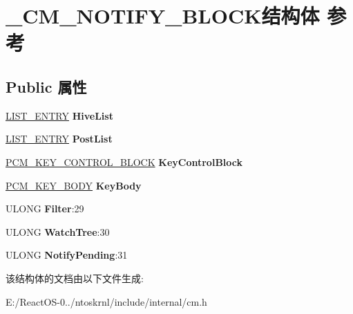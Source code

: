 \hypertarget{struct___c_m___n_o_t_i_f_y___b_l_o_c_k}{}\section{\+\_\+\+C\+M\+\_\+\+N\+O\+T\+I\+F\+Y\+\_\+\+B\+L\+O\+C\+K结构体 参考}
\label{struct___c_m___n_o_t_i_f_y___b_l_o_c_k}
\subsection*{Public 属性}
\begin{DoxyCompactItemize}
\item 
\mbox{\label{struct___c_m___n_o_t_i_f_y___b_l_o_c_k_a18d08b58c4d7385ede893b7e9ea954f4}} 
\hyperlink{struct___l_i_s_t___e_n_t_r_y}{L\+I\+S\+T\+\_\+\+E\+N\+T\+RY} {\bfseries Hive\+List}
\item 
\mbox{\label{struct___c_m___n_o_t_i_f_y___b_l_o_c_k_ad6dd92e2f87c396643b922464909ae00}} 
\hyperlink{struct___l_i_s_t___e_n_t_r_y}{L\+I\+S\+T\+\_\+\+E\+N\+T\+RY} {\bfseries Post\+List}
\item 
\mbox{\label{struct___c_m___n_o_t_i_f_y___b_l_o_c_k_a5061ac742d67a7c5cb9815509926cf3f}} 
\hyperlink{struct___c_m___k_e_y___c_o_n_t_r_o_l___b_l_o_c_k}{P\+C\+M\+\_\+\+K\+E\+Y\+\_\+\+C\+O\+N\+T\+R\+O\+L\+\_\+\+B\+L\+O\+CK} {\bfseries Key\+Control\+Block}
\item 
\mbox{\label{struct___c_m___n_o_t_i_f_y___b_l_o_c_k_a0a59430450f4a7501b830c978c571382}} 
\hyperlink{struct___c_m___k_e_y___b_o_d_y}{P\+C\+M\+\_\+\+K\+E\+Y\+\_\+\+B\+O\+DY} {\bfseries Key\+Body}
\item 
\mbox{\label{struct___c_m___n_o_t_i_f_y___b_l_o_c_k_af6ff376c709b69804422180315599d5c}} 
U\+L\+O\+NG {\bfseries Filter}\+:29
\item 
\mbox{\label{struct___c_m___n_o_t_i_f_y___b_l_o_c_k_a0074be41a2a303fe0b7f3549fa00b8dd}} 
U\+L\+O\+NG {\bfseries Watch\+Tree}\+:30
\item 
\mbox{\label{struct___c_m___n_o_t_i_f_y___b_l_o_c_k_ac5f91287b927c65f564586d18d1c331e}} 
U\+L\+O\+NG {\bfseries Notify\+Pending}\+:31
\end{DoxyCompactItemize}


该结构体的文档由以下文件生成\+:\begin{DoxyCompactItemize}
\item 
E\+:/\+React\+O\+S-\/0../ntoskrnl/include/internal/cm.\+h\end{DoxyCompactItemize}
